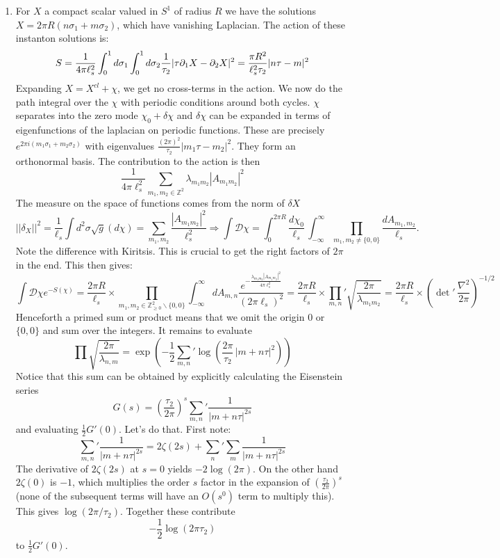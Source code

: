 \documentclass[11pt]{article}
\begin{document}
\begin{enumerate}
	\item For $X$ a compact scalar valued in $S^1$ of radius $R$ we have the solutions $X = 2\pi R (n \sigma_1 + m \sigma_2)$, which have vanishing Laplacian. The action of these instanton solutions is:
	\[
		S = \frac{1}{4 \pi \ell_s^2} \int_0^1 d\sigma_1 \int_0^1 d \sigma_2 \frac{1}{\tau_2} |\tau \partial_1 X - \partial_2 X|^2 = \frac{\pi R^2}{\ell_s^2 \tau_2}|n \tau - m|^2
	\]
	Expanding $X = X^{cl} + \chi$, we get no cross-terms in the action. We now do the path integral over the $\chi$ with periodic conditions around both cycles. $\chi$ separates into the zero mode $\chi_0 + \delta \chi$ and $\delta \chi$ can be expanded in terms of eigenfunctions of the laplacian on periodic functions. These are precisely $e^{2\pi i (m_1 \sigma_1 + m_2 \sigma_2)}$ with eigenvalues $\frac{(2\pi)^2}{\tau_2} |m_1 \tau - m_2|^2$. They form an orthonormal basis. The contribution to the action is then
	\[
		\frac{1}{4\pi \ell_s^2} \sum_{m_1,m_2 \in \mathbb Z^2} \lambda_{m_1 m_2} |A_{m_1 m_2}|^2
	\]
	The measure on the space of functions comes from the norm of $\delta X$
	\[
		||\delta_X||^2 = \frac{1}{\ell_s} \int d^2 \sigma \sqrt{g} (d \chi) = \sum_{m_1, m_2} \frac{|A_{m_1 m_2}|^2}{\ell_s^2}
		\Rightarrow \int \mathcal D \chi = \int_0^{2\pi R} \frac{d \chi_0}{\ell_s} \, \int_{-\infty}^\infty \prod_{m_1,m_2 \neq \{0,0\}} \frac{d A_{m_1, m_2}}{\ell_s}.
	\]
	Note the difference with Kiritsis. This is crucial to get the right factors of $2\pi$ in the end. This then gives:
	\[
		\int \mathcal D \chi e^{-S(\chi)} = \frac{2 \pi R}{\ell_s} \times \prod_{m_1, m_2 \in \mathbb Z^2_{\geq 0} \backslash \{0,0\}} \int_{-\infty}^\infty dA_{m,n} \frac{e^{-\frac{\lambda_{m_1 m_2} |A_{m_1 m_2}|^2}{4 \pi \ell_s^2}}}{(2\pi \ell_s)^2} 
		= \frac{2\pi R}{\ell_s} \times {\prod_{m,n}}' \sqrt{\frac{2\pi}{\lambda_{m_1 m_2}}} 
		= \frac{2\pi R}{\ell_s} \times ({\det}'\, \frac{\nabla^2}{2\pi})^{-1/2}
	\]
	Henceforth a primed sum or product means that we omit the origin $0$ or $\{0, 0\}$ and sum over the integers. It remains to evaluate 
	\[
		\prod \sqrt{\frac{2\pi}{\lambda_{n,m}}} = \exp\left(-\frac12 {\sum_{m, n}}' \log\left( \frac{2\pi}{\tau_2}\, |m + n \tau|^2 \right) \right)
	\]
	Notice that this sum can be obtained by explicitly calculating the Eisenstein series
	\[
		G(s) = \left( \frac{\tau_2}{2\pi} \right)^{s} {\sum_{m,n}}' \frac{1}{|m + n \tau|^{2s}}
	\]
	and evaluating $\frac12 G'(0)$. Let's do that. First note:
	\[
		{\sum_{m,n}}' \frac{1}{|m + n \tau|^{2s}} = 2 \zeta(2s) + {\sum_{n}}' \sum_m \frac{1}{|m+n\tau|^{2s}} 
	\]
	The derivative of $2 \zeta(2s)$ at $s=0$ yields $-2 \log(2\pi)$. On the other hand $2 \zeta(0)$ is $-1$, which multiplies the order $s$ factor  in the expansion of $\left(\frac{\tau_2}{2\pi}\right)^{s}$ (none of the subsequent terms will have an $O(s^0)$ term to multiply this). This gives $\log(2 \pi / \tau_2)$. Together these contribute
	\[
		-\frac12 \log(2 \pi \tau_2)
	\]
	to $\frac12 G'(0)$.
	

\end{enumerate}
\end{document}
